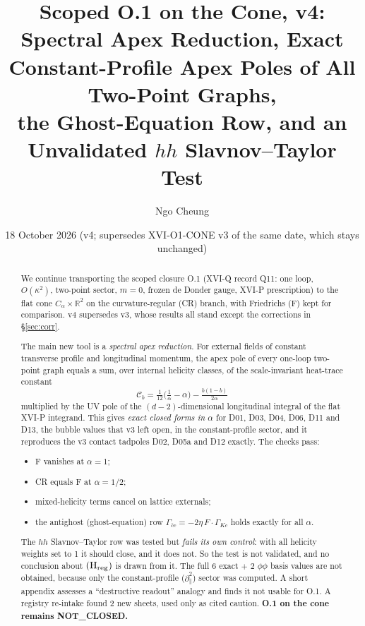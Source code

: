 \documentclass[11pt]{article}
\title{Scoped O.1 on the Cone, v4:\\ Spectral Apex Reduction, Exact Constant-Profile Apex Poles of All Two-Point Graphs,\\ the Ghost-Equation Row, and an Unvalidated $hh$ Slavnov--Taylor Test}
\author{Ngo Cheung}
\date{18 October 2026 (v4; supersedes XVI-O1-CONE v3 of the same date, which stays unchanged)}
\theoremstyle{definition}
\newcommand{\ka}{\kappa}
\newcommand{\Hreg}{(\mathrm H_{\rm reg})}
\newcommand{\Ccb}{\mathcal C}
\begin{document}
\sloppy
\maketitle
\begin{abstract}
We continue transporting the scoped closure O.1 (XVI-Q record Q11: one loop, $O(\ka^2)$, two-point sector, $m=0$, frozen de Donder gauge, XVI-P prescription) to the flat cone $C_\alpha\times\mathbb R^2$ on the curvature-regular (CR) branch, with Friedrichs (F) kept for comparison. v4 supersedes v3, whose results all stand except the corrections in \S\ref{sec:corr}.

The main new tool is a \emph{spectral apex reduction}. For external fields of constant transverse profile and longitudinal momentum, the apex pole of every one-loop two-point graph equals a sum, over internal helicity classes, of the scale-invariant heat-trace constant
\[\Ccb_b=\tfrac1{12}\big(\tfrac1\alpha-\alpha\big)-\tfrac{b(1-b)}{2\alpha}\]
multiplied by the UV pole of the $(d-2)$-dimensional longitudinal integral of the flat XVI-P integrand. This gives \emph{exact closed forms in $\alpha$} for D01, D03, D04, D06, D11 and D13, the bubble values that v3 left open, in the constant-profile sector, and it reproduces the v3 contact tadpoles D02, D05a and D12 exactly. The checks pass:
\begin{itemize}
\item F vanishes at $\alpha=1$;
\item CR equals F at $\alpha=1/2$;
\item mixed-helicity terms cancel on lattice externals;
\item the antighost (ghost-equation) row $\Gamma_{\bar cc}=-2\eta\,F\cdot\Gamma_{Kc}$ holds exactly for all $\alpha$.
\end{itemize}
The $hh$ Slavnov--Taylor row was tested but \emph{fails its own control}: with all helicity weights set to 1 it should close, and it does not. So the test is not validated, and no conclusion about $\Hreg$ is drawn from it. The full 6 exact $+$ 2 $\phi\phi$ basis values are not obtained, because only the constant-profile ($\partial_\parallel^2$) sector was computed. A short appendix assesses a ``destructive readout'' analogy and finds it not usable for O.1. A registry re-intake found 2 new sheets, used only as cited caution. \textbf{O.1 on the cone remains NOT\_CLOSED.}
\end{abstract}
\end{document}
